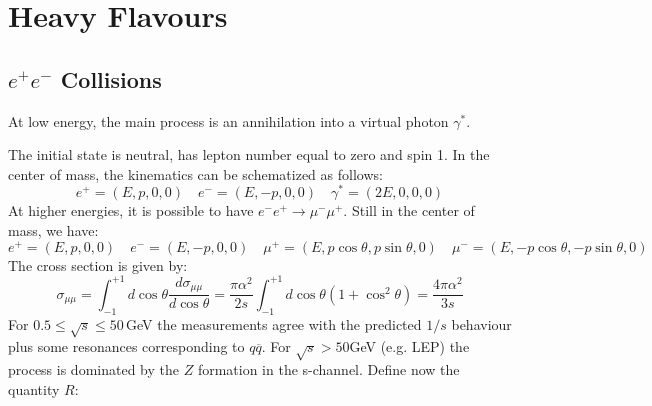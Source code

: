 \documentclass[10.75pt,a4paper,openright,bottom=2cm]{article}
\begin{document}
\section{Heavy Flavours}
\subsection{$e^+e^-$ Collisions}
At low energy, the main process is an annihilation into a virtual photon $\gamma^*$. 
\begin{center}
\end{center}
The initial state is neutral, has lepton number equal to zero and spin 1. In the center of mass, the kinematics can be schematized as follows:
\[
e^+=(E,p,0,0) \quad e^-=(E,-p,0,0) \quad \gamma^*=(2E,0,0,0)
\]
At higher energies, it is possible to have $e^-e^+\to\mu^-\mu^+$. Still in the center of mass, we have:
\[
e^+=(E,p,0,0) \quad e^-=(E,-p,0,0) \quad \mu^+=(E,p\cos\theta,p\sin\theta,0) \quad \mu^-=(E,-p\cos\theta,-p\sin\theta,0)
\]
The cross section is given by:
\[
\sigma_{\mu\mu}=\int_{-1}^{+1}d\cos\theta\frac{d\sigma_{\mu\mu}}{d\cos\theta}=\frac{\pi\alpha^2}{2s}\int_{-1}^{+1}d\cos\theta(1+\cos^2\theta)=\frac{4\pi\alpha^2}{3s}
\]
For $0.5\le\sqrt{s}\le50$\,GeV the measurements agree with the predicted $1/s$ behaviour plus some resonances corresponding to $q\overline{q}$. For $\sqrt{s}>50$\;GeV (e.g. LEP) the process is dominated by the $Z$ formation in the s-channel. Define now the quantity $R$:
\end{document}
